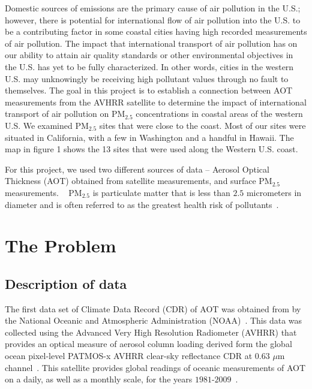 \documentclass[10pt]{article}
\newcommand{\arvind}[1]{{\color{red}{Arvind: {#1}}}}
\begin{document}
Domestic sources of emissions are the primary cause of air pollution in the U.S.; however, there is potential for international flow of air pollution into the U.S. to be a contributing factor in some coastal cities having high recorded measurements of air pollution. The impact that international transport of air pollution has on our ability to attain air quality standards or other environmental objectives in the U.S. has yet to be fully characterized. In other words, cities in the western U.S. may unknowingly be receiving high pollutant values through no fault to themselves. The goal in this project is to establish a connection between AOT measurements from the AVHRR satellite to determine the impact of international transport of air pollution on PM$_{2.5}$ concentrations in coastal areas of the western U.S. We examined PM$_{2.5}$ sites that were close to the coast. Most of our sites were situated in California, with a few in Washington and a handful in Hawaii. The map in figure 1 shows the 13 sites that were used along the Western U.S. coast. 



For this project, we used two different sources of data -- Aerosol Optical Thickness (AOT) obtained from satellite measurements, and surface PM$_{2.5}$ measurements. ~\arvind{Please explicitly define AOT. }
PM$_{2.5}$ is particulate matter that is less than $2.5$ micrometers in diameter and is often referred to as the greatest health risk of pollutants~\cite{epa}.

\section{The Problem}


\subsection{Description of data}

The first data set of Climate Data Record (CDR) of AOT was obtained from by the National Oceanic and Atmospheric Administration (NOAA)~\cite{noaa}. This data was collected using the  Advanced Very High Resolution Radiometer (AVHRR) that provides an optical measure of aerosol column loading derived form the global ocean pixel-level PATMOS-x AVHRR clear-sky reflectance CDR at $0.63$ $\mu$m channel~\cite{noaa}. This satellite provides global readings of oceanic measurements of AOT on a daily, as well as a monthly scale, for the years $1981$-$2009$~\cite{noaa}.
\end{document}
